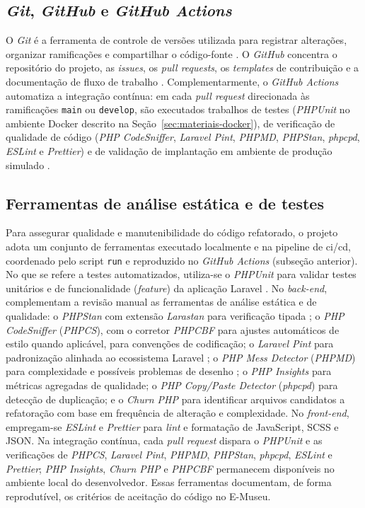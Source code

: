 \subsection{\textit{Git}, \textit{GitHub} e \textit{GitHub Actions}}

O \textit{Git} é a ferramenta de controle de versões utilizada para registrar alterações, organizar ramificações e compartilhar o código-fonte \cite{git}. O \textit{GitHub} concentra o repositório do projeto, as \textit{issues}, os \textit{pull requests}, os \textit{templates} de contribuição e a documentação de fluxo de trabalho \cite{github}. Complementarmente, o \textit{GitHub Actions} automatiza a integração contínua: em cada \textit{pull request} direcionada às ramificações \texttt{main} ou \texttt{develop}, são executados trabalhos de testes (\textit{PHPUnit} no ambiente Docker descrito na Seção~\ref{sec:materiais-docker}), de verificação de qualidade de código (\textit{PHP CodeSniffer}, \textit{Laravel Pint}, \textit{PHPMD}, \textit{PHPStan}, \textit{phpcpd}, \textit{ESLint} e \textit{Prettier}) e de validação de implantação em ambiente de produção simulado \cite{githubactions}.


\subsection{Ferramentas de análise estática e de testes}

Para assegurar qualidade e manutenibilidade do código refatorado, o projeto adota um conjunto de ferramentas executado localmente e na pipeline de \acrfull{ci/cd}, coordenado pelo script \texttt{run} e reproduzido no \textit{GitHub Actions} (subseção anterior). No que se refere a testes automatizados, utiliza-se o \textit{PHPUnit} para validar testes unitários e de funcionalidade (\textit{feature}) da aplicação Laravel \cite{phpunit}. No \textit{back-end}, complementam a revisão manual as ferramentas de análise estática e de qualidade: o \textit{PHPStan} com extensão \textit{Larastan} para verificação tipada \cite{phpstan}; o \textit{PHP CodeSniffer} (\textit{PHPCS}), com o corretor \textit{PHPCBF} para ajustes automáticos de estilo quando aplicável, para convenções de codificação; o \textit{Laravel Pint} para padronização alinhada ao ecossistema Laravel \cite{laravelpint}; o \textit{PHP Mess Detector} (\textit{PHPMD}) para complexidade e possíveis problemas de desenho \cite{phpmd}; o \textit{PHP Insights} para métricas agregadas de qualidade; o \textit{PHP Copy/Paste Detector} (\textit{phpcpd}) para detecção de duplicação; e o \textit{Churn PHP} para identificar arquivos candidatos a refatoração com base em frequência de alteração e complexidade. No \textit{front-end}, empregam-se \textit{ESLint} e \textit{Prettier} para \textit{lint} e formatação de JavaScript, SCSS e JSON. Na integração contínua, cada \textit{pull request} dispara o \textit{PHPUnit} e as verificações de \textit{PHPCS}, \textit{Laravel Pint}, \textit{PHPMD}, \textit{PHPStan}, \textit{phpcpd}, \textit{ESLint} e \textit{Prettier}; \textit{PHP Insights}, \textit{Churn PHP} e \textit{PHPCBF} permanecem disponíveis no ambiente local do desenvolvedor. Essas ferramentas documentam, de forma reprodutível, os critérios de aceitação do código no E-Museu.


